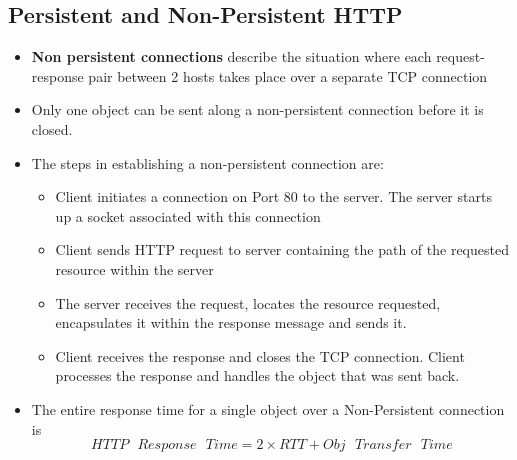 \documentclass{article}
\theoremstyle{plain}
\theoremstyle{definition}
\begin{document}
\subsection{Persistent and Non-Persistent HTTP}
\begin{itemize}
    \item \textbf{Non persistent connections} describe the situation where each request-response pair between 2 hosts takes place over a separate TCP connection
    
    \item Only one object can be sent along a non-persistent connection before it is closed. 
    
    \item The steps in establishing a non-persistent connection are:
    
    \begin{itemize}
        \item Client initiates a connection on Port 80 to the server. The server starts up a socket associated with this connection
        
        \item Client sends HTTP request to server containing the path of the requested resource within the server
        
        \item The server receives the request, locates the resource requested, encapsulates it within the response message and sends it.
        
        \item Client receives the response and closes the TCP connection. Client processes the response and handles the object that was sent back.
    \end{itemize}
    
    \item The entire response time for a single object over a Non-Persistent connection is
    \begin{equation*}
        HTTP\text{ }Response\text{ }Time = 2 \times RTT + Obj\text{ }Transfer\text{ }Time
    \end{equation*}
\end{itemize}
\end{document}
